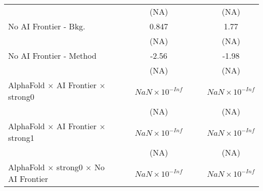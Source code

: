 \begin{tabular}{lcccccc}
                                                                              &                        &                        & (NA)                   &                        &                        & (NA)\\   
   No AI Frontier - Bkg.                                                      &                        &                        & 0.847                  &                        &                        & 1.77\\   
                                                                              &                        &                        & (NA)                   &                        &                        & (NA)\\   
   No AI Frontier - Method                                                    &                        &                        & -2.56                  &                        &                        & -1.98\\   
                                                                              &                        &                        & (NA)                   &                        &                        & (NA)\\   
   AlphaFold $\times$ AI Frontier $\times$ strong0                            &                        &                        & $NaN\times 10^{-Inf}$  &                        &                        & $NaN\times 10^{-Inf}$\\    
                                                                              &                        &                        & (NA)                   &                        &                        & (NA)\\   
   AlphaFold $\times$ AI Frontier $\times$ strong1                            &                        &                        & $NaN\times 10^{-Inf}$  &                        &                        & $NaN\times 10^{-Inf}$\\    
                                                                              &                        &                        & (NA)                   &                        &                        & (NA)\\   
   AlphaFold $\times$ strong0 $\times$ No AI Frontier                         &                        &                        & $NaN\times 10^{-Inf}$  &                        &                        & $NaN\times 10^{-Inf}$\\    

\end{tabular}
